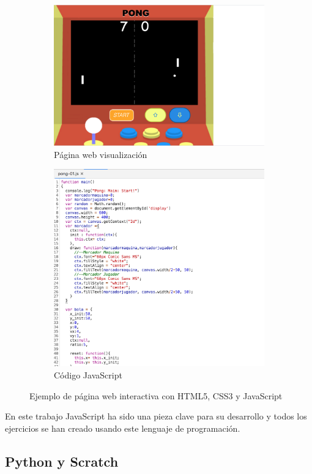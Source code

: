 \begin{figure}[H]
  \begin{subfigure}[b]{0.5\textwidth}
  \centering
    \includegraphics[width=1\textwidth, height=0.6\textwidth]{chapters/images/pong.png}
    \caption{Página web visualización}
    \label{fig:f1}
  \end{subfigure}
  \hfill
  \begin{subfigure}[b]{0.5\textwidth}
  \centering
    \includegraphics[width=1\textwidth, height=0.6\textwidth]{chapters/images/codigojs.png}
    \caption{Código JavaScript}
    \label{fig:f2}
  \end{subfigure}
  \caption{Ejemplo de página web interactiva con HTML5, CSS3 y JavaScript }
\end{figure}

En este trabajo JavaScript ha sido una pieza clave para su desarrollo y todos los ejercicios se han creado usando este lenguaje de programación.
 
\subsection{Python y Scratch}


